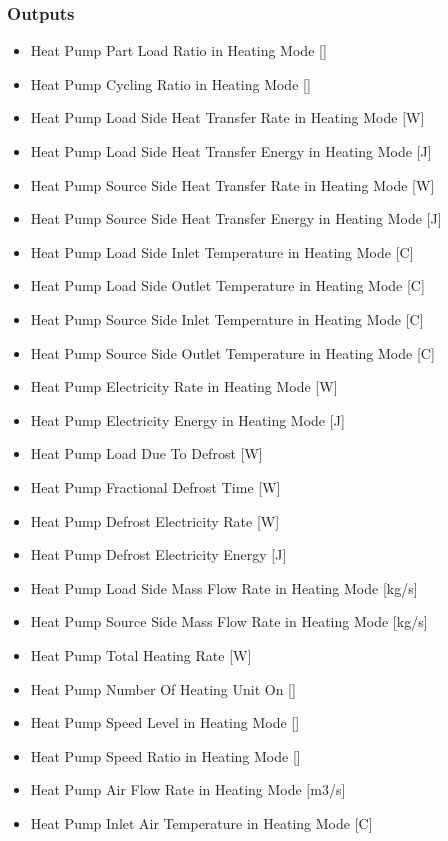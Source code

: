 \subsubsection{Outputs}\label{outputs-heatpump-air-to-water}
\begin{itemize}
\item Heat Pump Part Load Ratio in Heating Mode {[}{]}
\item Heat Pump Cycling Ratio in Heating Mode {[}{]}
\item Heat Pump Load Side Heat Transfer Rate in Heating Mode {[}W{]}
\item Heat Pump Load Side Heat Transfer Energy in Heating Mode {[}J{]}
\item Heat Pump Source Side Heat Transfer Rate in Heating Mode {[}W{]}
\item Heat Pump Source Side Heat Transfer Energy in Heating Mode {[}J{]}
\item Heat Pump Load Side Inlet Temperature in Heating Mode {[}C{]}
\item Heat Pump Load Side Outlet Temperature in Heating Mode {[}C{]}
\item Heat Pump Source Side Inlet Temperature in Heating Mode {[}C{]}
\item Heat Pump Source Side Outlet Temperature in Heating Mode {[}C{]}
\item Heat Pump Electricity Rate in Heating Mode {[}W{]}
\item Heat Pump Electricity Energy in Heating Mode {[}J{]}
\item Heat Pump Load Due To Defrost {[}W{]}
\item Heat Pump Fractional Defrost Time {[}W{]}
\item Heat Pump Defrost Electricity Rate {[}W{]}
\item Heat Pump Defrost Electricity Energy {[}J{]}
\item Heat Pump Load Side Mass Flow Rate in Heating Mode {[}kg/s{]}
\item Heat Pump Source Side Mass Flow Rate in Heating Mode {[}kg/s{]}
\item Heat Pump Total Heating Rate {[}W{]}
\item Heat Pump Number Of Heating Unit On {[}{]}
\item Heat Pump Speed Level in Heating Mode {[}{]}
\item Heat Pump Speed Ratio in Heating Mode {[}{]}
\item Heat Pump Air Flow Rate in Heating Mode {[}m3/s{]}
\item Heat Pump Inlet Air Temperature in Heating Mode {[}C{]}

\end{itemize}
